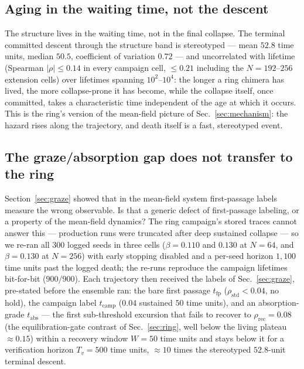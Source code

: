 \documentclass[pdflatex,sn-mathphys,Numbered]{sn-jnl}
\begin{document}
\subsection{Aging in the waiting time, not the descent}

The structure lives in the waiting time, not in the final collapse. The terminal
committed descent through the structure band is stereotyped --- mean $52.8$ time
units, median $50.5$, coefficient of variation $0.72$ --- and uncorrelated with
lifetime (Spearman $|\rho| \le 0.14$ in every campaign cell, $\le 0.21$
including the $N = 192$--$256$ extension cells) over lifetimes spanning
$10^2$--$10^4$: the longer a ring chimera has lived, the more collapse-prone it
has become, while the collapse itself, once committed, takes a characteristic
time independent of the age at which it occurs. This is the ring's version of
the mean-field picture of Sec.~\ref{sec:mechanism}: the hazard rises along the
trajectory, and death itself is a fast, stereotyped event.

\subsection{The graze/absorption gap does not transfer to the ring}
\label{sec:ring:xlabel}

Section~\ref{sec:graze} showed that in the mean-field system first-passage
labels measure the wrong observable. Is that a generic defect of
first-passage labeling, or a property of the mean-field dynamics? The ring
campaign's stored traces cannot answer this --- production runs were
truncated after deep sustained collapse --- so we re-ran all $300$ logged
seeds in three cells ($\beta = 0.110$ and $0.130$ at $N = 64$, and
$\beta = 0.130$ at $N = 256$) with early stopping disabled and a per-seed
horizon $1{,}100$ time units past the logged death; the re-runs reproduce
the campaign lifetimes bit-for-bit ($900/900$). Each trajectory then
received the labels of Sec.~\ref{sec:graze}, pre-stated before the ensemble
ran: the bare first passage $t_{\mathrm{fp}}$
($\rho_{\mathrm{std}} < 0.04$, no hold), the campaign label
$t_{\mathrm{camp}}$ ($0.04$ sustained $50$ time units), and an
absorption-grade $t_{\mathrm{abs}}$ --- the first sub-threshold excursion
that fails to recover to $\rho_{\mathrm{rec}} = 0.08$ (the equilibration-gate
contrast of Sec.~\ref{sec:ring}, well below the living plateau
${\approx}0.15$) within a recovery window $W = 50$ time units and stays
below it for a verification horizon $T_v = 500$ time units, ${\approx}10$
times the stereotyped $52.8$-unit terminal descent.
\end{document}

